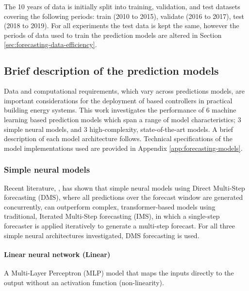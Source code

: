 The 10 years of data is initially split into training, validation, and test datasets covering the following periods: train (2010 to 2015), validate (2016 to 2017), test (2018 to 2019). For all experiments the test data is kept the same, however the periods of data used to train the prediction models are altered in Section \ref{sec:forecasting-data-efficiency}.

\subsection{Brief description of the prediction models}


Data and computational requirements, which vary across predictions models, are important considerations for the deployment of  based controllers in practical building energy systems. This work investigates the performance of 6 machine learning based prediction models which span a range of model characteristics; 3 simple neural models, and 3 high-complexity, state-of-the-art models. A brief description of each model architecture follows. Technical specifications of the model implementations used are provided in Appendix \ref{app:forecasting-models}.

\subsubsection{Simple neural models}

Recent literature, \citep{zeng2023AreTransformersEffective}, has shown that simple neural models using Direct Multi-Step forecasting (DMS), where all predictions over the forecast window are generated concurrently, can outperform complex, transformer-based models using traditional, Iterated Multi-Step forecasting (IMS), in which a single-step forecaster is applied iteratively to generate a multi-step forecast. For all three simple neural architectures investigated, DMS forecasting is used.

\paragraph{Linear neural network (Linear)}

A Multi-Layer Perceptron (MLP) model that maps the inputs directly to the output without an activation function (non-linearity).

